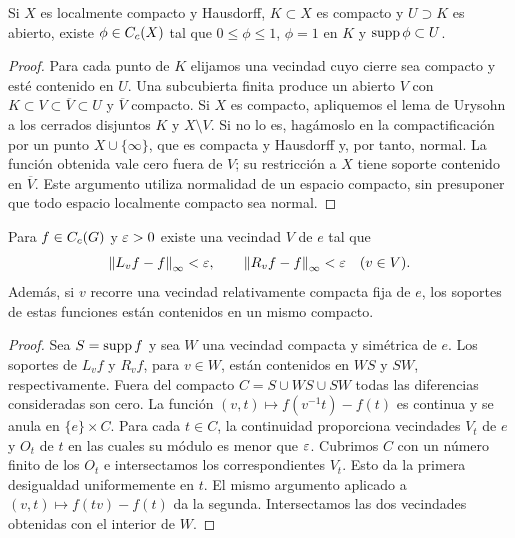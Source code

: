 \begin{lema}\label{v4:haar-corte}
Si $X$ es localmente compacto y Hausdorff, $K\subset X$ es compacto y $U\supset K$ es abierto, existe $\phi\in C_c(X)$ tal que $0\leq\phi\leq1$, $\phi=1$ en $K$ y $\operatorname{supp}\phi\subset U$.
\end{lema}
\begin{proof}
Para cada punto de $K$ elijamos una vecindad cuyo cierre sea compacto y esté contenido en $U$. Una subcubierta finita produce un abierto $V$ con $K\subset V\subset\overline V\subset U$ y $\overline V$ compacto. Si $X$ es compacto, apliquemos el lema de Urysohn a los cerrados disjuntos $K$ y $X\setminus V$. Si no lo es, hagámoslo en la compactificación por un punto $X\cup\{\infty\}$, que es compacta y Hausdorff y, por tanto, normal. La función obtenida vale cero fuera de $V$; su restricción a $X$ tiene soporte contenido en $\overline V$. Este argumento utiliza normalidad de un espacio compacto, sin presuponer que todo espacio localmente compacto sea normal.
\end{proof}

\begin{lema}\label{v4:haar-uniforme}
Para $f\in C_c(G)$ y $\varepsilon>0$ existe una vecindad $V$ de $e$ tal que
\[
 \left\lVert L_vf-f\right\rVert_\infty<\varepsilon,\qquad
 \left\lVert R_vf-f\right\rVert_\infty<\varepsilon\quad(v\in V).
\]
Además, si $v$ recorre una vecindad relativamente compacta fija de $e$, los soportes de estas funciones están contenidos en un mismo compacto.
\end{lema}
\begin{proof}
Sea $S=\operatorname{supp} f$ y sea $W$ una vecindad compacta y simétrica de $e$. Los soportes de $L_vf$ y $R_vf$, para $v\in W$, están contenidos en $WS$ y $SW$, respectivamente. Fuera del compacto $C=S\cup WS\cup SW$ todas las diferencias consideradas son cero. La función $(v,t)\mapsto f(v^{-1}t)-f(t)$ es continua y se anula en $\{e\}\times C$. Para cada $t\in C$, la continuidad proporciona vecindades $V_t$ de $e$ y $O_t$ de $t$ en las cuales su módulo es menor que $\varepsilon$. Cubrimos $C$ con un número finito de los $O_t$ e intersectamos los correspondientes $V_t$. Esto da la primera desigualdad uniformemente en $t$. El mismo argumento aplicado a $(v,t)\mapsto f(tv)-f(t)$ da la segunda. Intersectamos las dos vecindades obtenidas con el interior de $W$.
\end{proof}

